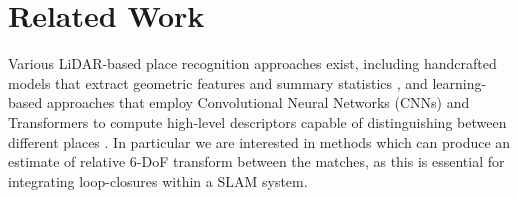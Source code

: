 \chapter{Related Work}
\label{sec:related}



Various LiDAR-based place recognition approaches exist, including handcrafted models that extract geometric features and summary statistics \cite{kim2018iros, yuan2023icra}, and learning-based approaches that employ Convolutional Neural Networks (CNNs) and Transformers to compute high-level descriptors capable of distinguishing between different places \cite{vidanapathirana2022icra, komorowski2022ral}.
In particular we are interested in methods which can produce an estimate of relative 6-DoF transform between the matches, as this is essential for integrating loop-closures within a SLAM system.   

